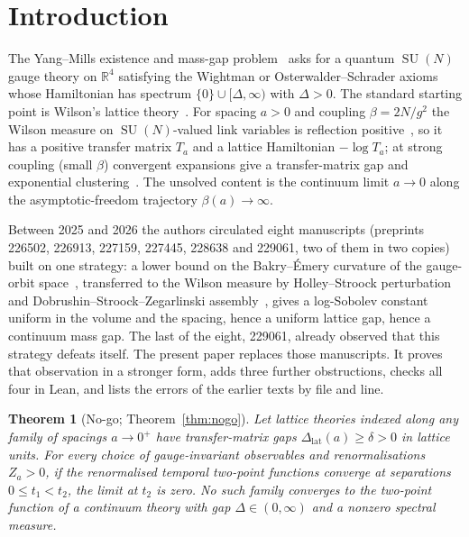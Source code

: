 \documentclass[aps,prd,twocolumn,superscriptaddress,nofootinbib,floatfix]{revtex4-2}
\newtheorem{theorem}{Theorem}
\theoremstyle{definition}
\theoremstyle{remark}
\DeclareMathOperator{\SU}{SU}
\newcommand{\R}{\mathbb{R}}
\newcommand{\Dlat}{\Delta_{\mathrm{lat}}}
\begin{document}
\section{Introduction}
\label{sec:intro}

The Yang--Mills existence and mass-gap problem~\cite{JW00} asks for a
quantum $\SU(N)$ gauge theory on $\R^4$ satisfying the Wightman or
Osterwalder--Schrader axioms~\cite{OS73,OS75,GJ87} whose Hamiltonian has
spectrum $\{0\}\cup[\Delta,\infty)$ with $\Delta>0$. The standard starting
point is Wilson's lattice theory~\cite{Wil74}. For spacing $a>0$ and
coupling $\beta=2N/g^2$ the Wilson measure on $\SU(N)$-valued link variables
is reflection positive~\cite{OSei78}, so it has a positive transfer matrix
$T_a$ and a lattice Hamiltonian $-\log T_a$; at strong coupling (small
$\beta$) convergent expansions give a transfer-matrix gap and exponential
clustering~\cite{OSei78,Sei82,KP86}. The unsolved content is the continuum
limit $a\to0$ along the asymptotic-freedom trajectory $\beta(a)\to\infty$.

Between 2025 and 2026 the authors circulated eight manuscripts (preprints
226502, 226913, 227159, 227445, 228638 and 229061, two of them in two
copies) built on one strategy: a lower bound on the Bakry--\'Emery curvature
of the gauge-orbit space~\cite{BE85,Mil76}, transferred to the Wilson
measure by Holley--Stroock perturbation~\cite{HS87} and
Dobrushin--Stroock--Zegarlinski assembly~\cite{SZ92}, gives a log-Sobolev
constant uniform in the volume and the spacing, hence a uniform lattice gap,
hence a continuum mass gap. The last of the eight, 229061, already observed
that this strategy defeats itself. The present paper replaces those
manuscripts. It proves that observation in a stronger form, adds three
further obstructions, checks all four in Lean, and lists the errors of the
earlier texts by file and line.

\begin{theorem}[No-go; Theorem~\ref{thm:nogo}]
\label{thm:A}
Let lattice theories indexed along any family of spacings $a\to0^+$ have
transfer-matrix gaps $\Dlat(a)\ge\delta>0$ in lattice units. For every
choice of gauge-invariant observables and renormalisations $Z_a>0$, if the
renormalised temporal two-point functions converge at separations
$0\le t_1<t_2$, the limit at $t_2$ is zero. No such family converges to the
two-point function of a continuum theory with gap $\Delta\in(0,\infty)$
and a nonzero spectral measure.
\end{theorem}
\end{document}
